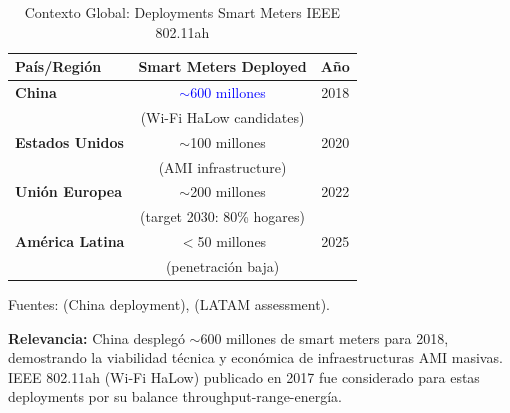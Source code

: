 
\begin{table}[htbp]
\centering
\caption{Contexto Global: Deployments Smart Meters IEEE 802.11ah}
\label{tab:smart_meter_deployments_context}
\begin{tabular}{|l|c|c|}
\hline
\textbf{País/Región} & \textbf{Smart Meters Deployed} & \textbf{Año} \\
\hline
\hline
\textbf{China} & \textcolor{blue}{$\sim$600 millones} & 2018 \\
& (Wi-Fi HaLow candidates) & \cite{zhengPerformancePowerConsumption2018} \\
\hline
\textbf{Estados Unidos} & $\sim$100 millones & 2020 \\
& (AMI infrastructure) & \\
\hline
\textbf{Unión Europea} & $\sim$200 millones & 2022 \\
& (target 2030: 80\% hogares) & \\
\hline
\textbf{América Latina} & $<$50 millones & 2025 \\
& (penetración baja) & \cite{ponceSmartGridAssessment2017} \\
\hline
\end{tabular}
\medskip

\small
Fuentes: \cite{zhengPerformancePowerConsumption2018} (China deployment), 
\cite{ponceSmartGridAssessment2017} (LATAM assessment).

\medskip
\textbf{Relevancia:} China desplegó $\sim$600 millones de smart meters para 2018, 
demostrando la viabilidad técnica y económica de infraestructuras AMI masivas. 
IEEE 802.11ah (Wi-Fi HaLow) publicado en 2017 fue considerado para estas deployments 
por su balance throughput-range-energía.
\end{table}


